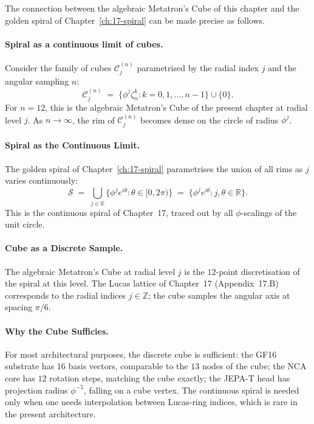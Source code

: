 The connection between the algebraic Metatron's Cube of this
chapter and the golden spiral of Chapter~\ref{ch:17-spiral} can be
made precise as follows.

\paragraph{Spiral as a continuous limit of cubes.}
Consider the family of cubes $\mathcal{C}_{j}^{(n)}$ parametrised
by the radial index $j$ and the angular sampling $n$:
\[
  \mathcal{C}_{j}^{(n)} \;=\; \bigl\{ \phi^{j} \zeta_{n}^{k} :
    k = 0, 1, \ldots, n-1 \bigr\} \cup \{ 0 \}.
\]
For $n = 12$, this is the algebraic Metatron's Cube of the present
chapter at radial level $j$. As $n \to \infty$, the rim of
$\mathcal{C}_{j}^{(n)}$ becomes dense on the circle of radius
$\phi^{j}$.

\paragraph{Spiral as the Continuous Limit.}
The golden spiral of Chapter~\ref{ch:17-spiral} parametrises the
union of all rims as $j$ varies continuously:
\[
  \mathcal{S} \;=\; \bigcup_{j \in \mathbb{R}} \bigl\{ \phi^{j}
    e^{i\theta} : \theta \in [0, 2\pi) \bigr\}
              \;=\; \bigl\{ \phi^{j} e^{i\theta} : j, \theta
                \in \mathbb{R} \bigr\}.
\]
This is the continuous spiral of Chapter~17, traced out by all
$\phi$-scalings of the unit circle.

\paragraph{Cube as a Discrete Sample.}
The algebraic Metatron's Cube at radial level $j$ is the
$12$-point discretisation of the spiral at this level. The Lucas
lattice of Chapter~17 (Appendix~17.B) corresponds to the radial
indices $j \in \mathbb{Z}$; the cube samples the angular axis at
spacing $\pi/6$.

\paragraph{Why the Cube Sufficies.}
For most architectural purposes, the discrete cube is sufficient:
the GF16 substrate has $16$ basis vectors, comparable to the $13$
nodes of the cube; the NCA core has $12$ rotation steps,
matching the cube exactly; the JEPA-T head has projection radius
$\phi^{-5}$, falling on a cube vertex. The continuous spiral is
needed only when one needs interpolation between Lucas-ring
indices, which is rare in the present architecture.

